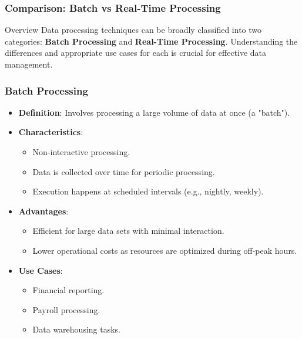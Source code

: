 \documentclass[aspectratio=169]{beamer}
\begin{document}
\begin{frame}[fragile]
    \frametitle{Comparison: Batch vs Real-Time Processing}
    \begin{block}{Overview}
        Data processing techniques can be broadly classified into two categories: 
        \textbf{Batch Processing} and \textbf{Real-Time Processing}. Understanding the differences and appropriate use cases for each is crucial for effective data management.
    \end{block}
\end{frame}

\begin{frame}[fragile]
    \frametitle{Batch Processing}
    \begin{itemize}
        \item \textbf{Definition}: Involves processing a large volume of data at once (a "batch").
        \item \textbf{Characteristics}:
        \begin{itemize}
            \item Non-interactive processing.
            \item Data is collected over time for periodic processing.
            \item Execution happens at scheduled intervals (e.g., nightly, weekly).
        \end{itemize}
        \item \textbf{Advantages}:
        \begin{itemize}
            \item Efficient for large data sets with minimal interaction.
            \item Lower operational costs as resources are optimized during off-peak hours.
        \end{itemize}
        \item \textbf{Use Cases}:
        \begin{itemize}
            \item Financial reporting.
            \item Payroll processing.
            \item Data warehousing tasks.
        \end{itemize}
    \end{itemize}
\end{frame}
\end{document}
